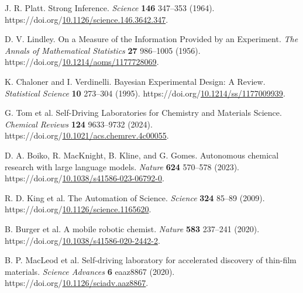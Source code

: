\documentclass[10pt,a4paper]{article}
\newlength{\csllabelwidth}\setlength{\csllabelwidth}{2em}
\newenvironment{CSLReferences}[2]{\small\setlength{\parindent}{0pt}\setlength{\parskip}{4pt}}{\par}
\newcommand{\CSLLeftMargin}[1]{\par\noindent\makebox[\csllabelwidth][l]{#1}}
\newcommand{\CSLRightInline}[1]{\parbox[t]{\dimexpr\linewidth-\csllabelwidth\relax}{#1}\par}
\begin{document}
\protect{}\label{refs}
\begin{CSLReferences}{0}{1}
\hypertarget{ref-platt1964inference}{}
\CSLLeftMargin{1. }%
\CSLRightInline{J. R. Platt. {Strong Inference}. \emph{Science} \textbf{146} 347--353 (1964). https://doi.org/\href{https://doi.org/10.1126/science.146.3642.347}{10.1126/science.146.3642.347}.}

\hypertarget{ref-lindley1956information}{}
\CSLLeftMargin{2. }%
\CSLRightInline{D. V. Lindley. {On a Measure of the Information Provided by an Experiment}. \emph{The Annals of Mathematical Statistics} \textbf{27} 986--1005 (1956). https://doi.org/\href{https://doi.org/10.1214/aoms/1177728069}{10.1214/aoms/1177728069}.}

\hypertarget{ref-chaloner1995design}{}
\CSLLeftMargin{3. }%
\CSLRightInline{K. Chaloner and I. Verdinelli. {Bayesian Experimental Design: A Review}. \emph{Statistical Science} \textbf{10} 273--304 (1995). https://doi.org/\href{https://doi.org/10.1214/ss/1177009939}{10.1214/ss/1177009939}.}

\hypertarget{ref-tom2024selfdriving}{}
\CSLLeftMargin{4. }%
\CSLRightInline{G. Tom et al. {Self-Driving Laboratories for Chemistry and Materials Science}. \emph{Chemical Reviews} \textbf{124} 9633--9732 (2024). https://doi.org/\href{https://doi.org/10.1021/acs.chemrev.4c00055}{10.1021/acs.chemrev.4c00055}.}

\hypertarget{ref-boiko2023autonomous}{}
\CSLLeftMargin{5. }%
\CSLRightInline{D. A. Boiko, R. MacKnight, B. Kline, and G. Gomes. Autonomous chemical research with large language models. \emph{Nature} \textbf{624} 570--578 (2023). https://doi.org/\href{https://doi.org/10.1038/s41586-023-06792-0}{10.1038/s41586-023-06792-0}.}

\hypertarget{ref-king2009automation}{}
\CSLLeftMargin{6. }%
\CSLRightInline{R. D. King et al. {The Automation of Science}. \emph{Science} \textbf{324} 85--89 (2009). https://doi.org/\href{https://doi.org/10.1126/science.1165620}{10.1126/science.1165620}.}

\hypertarget{ref-burger2020mobile}{}
\CSLLeftMargin{7. }%
\CSLRightInline{B. Burger et al. {A mobile robotic chemist}. \emph{Nature} \textbf{583} 237--241 (2020). https://doi.org/\href{https://doi.org/10.1038/s41586-020-2442-2}{10.1038/s41586-020-2442-2}.}

\hypertarget{ref-macleod2020selfdriving}{}
\CSLLeftMargin{8. }%
\CSLRightInline{B. P. MacLeod et al. {Self-driving laboratory for accelerated discovery of thin-film materials}. \emph{Science Advances} \textbf{6} eaaz8867 (2020). https://doi.org/\href{https://doi.org/10.1126/sciadv.aaz8867}{10.1126/sciadv.aaz8867}.}


\end{CSLReferences}
\end{document}
